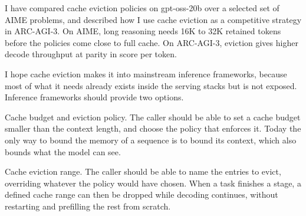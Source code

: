 \documentclass[10pt,letterpaper]{article}
\newcommand{\term}[1]{{\fontseries{b}\selectfont #1}}
\begin{document}
I have compared cache eviction policies on gpt-oss-20b over a selected set of AIME problems, and described how I use cache eviction as a competitive strategy in ARC-AGI-3.
On AIME, long reasoning needs 16K to 32K retained tokens before the policies come close to full cache.
On ARC-AGI-3, eviction gives higher decode throughput at parity in score per token.

I hope cache eviction makes it into mainstream inference frameworks, because most of what it needs already exists inside the serving stacks but is not exposed.
Inference frameworks should provide two options.

\term{Cache budget and eviction policy.}
The caller should be able to set a cache budget smaller than the context length, and choose the policy that enforces it.
Today the only way to bound the memory of a sequence is to bound its context, which also bounds what the model can see.

\term{Cache eviction range.}
The caller should be able to name the entries to evict, overriding whatever the policy would have chosen.
When a task finishes a stage, a defined cache range can then be dropped while decoding continues, without restarting and prefilling the rest from scratch.

\clearpage
\end{document}
